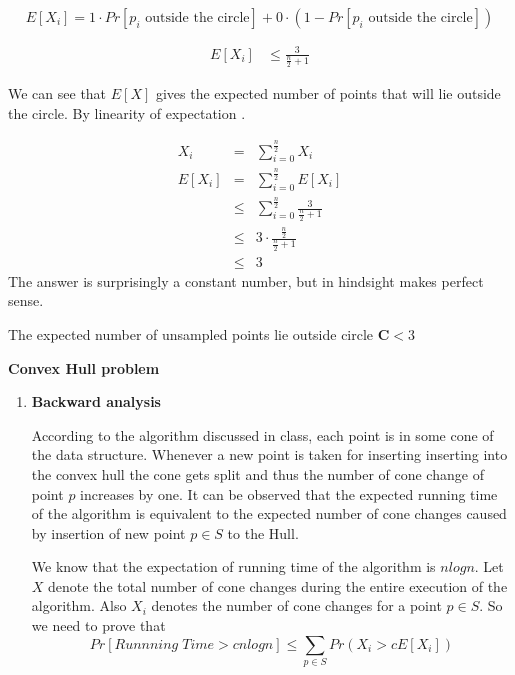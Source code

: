 \documentclass{assignment}
\begin{document}
\begin{problemlist}
\begin{problem}
\begin{answer}
\begin{equation}
E[X_i]  =   1 \cdot  Pr[\text{$p_i$ outside the circle}] + 0 \cdot (1- Pr[\text{$p_i$ outside the circle}])
\end{equation}

\begin{eqnarray}
E[X_i] & \leq \frac{3}{\frac{n}{2} + 1}
\end{eqnarray}

 We can see that $E[X]$ gives the expected number of points that will lie outside the circle. By linearity of expectation .

\begin{eqnarray}
X_i & = & \sum_{i=0}^{\frac{n}{2}}X_i \\
E[X_i] & = & \sum_{i=0}^{\frac{n}{2}}E[X_i] \\
& \leq & \sum_{i=0}^{\frac{n}{2}} \frac{3}{\frac{n}{2} + 1} \\
& \leq & 3 \cdot \frac{\frac{n}{2}}{\frac{n}{2} + 1}  \\
& \leq & 3
\end{eqnarray}
The answer is surprisingly a constant number, but in hindsight makes perfect sense.  

The expected number of unsampled points lie outside circle $\mathbf{C} < 3$
\end{answer}
\end{problem}

\pbitem 
\begin{problem} 
\textbf{Convex Hull problem}\\

\begin{enumerate}
\item \textbf{Backward analysis}\\
\begin{answer}
According to the algorithm discussed in class, each point is in some cone of the
data structure. Whenever a new point is taken for inserting 
inserting into the convex hull the cone gets split and thus the number of cone
change of point $p$ increases by one. It can be observed that
the expected running time of the algorithm is equivalent to the expected number of
cone changes caused by insertion of new point $p\in S$ to the Hull.

We know that the expectation of running time of the algorithm is $nlogn$. Let $X$
denote the total number of cone changes during the entire execution 
of the algorithm. Also $X_i$ denotes the number of cone changes for a point $p \in
S$. So we need to prove that 
\begin{equation}
Pr[Runnning \; Time > c nlogn] \leq \sum_{ p \in S} Pr(X_i > cE[X_i]) 
\end{equation}


\end{answer}
\end{enumerate}
\end{problem}
\end{problemlist}
\end{document}
